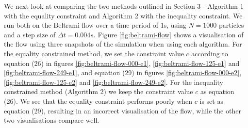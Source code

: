 \documentclass[11pt, oneside]{article}   	%
\newcommand{\dt}{\Delta t}
\begin{document}
We next look at comparing the two methods outlined in Section 3 - Algorithm 1 with the equality constraint and Algorithm 2 with the inequality constraint. We run both on the Beltrami flow over a time period of 1s, using \(N = 1000\) particles and a step size of \(\dt = 0.004s\). Figure \ref{fig:beltrami-flow} shows a visualisation of the flow using three snapshots of the simulation when using each algorithm.  For the equality constrained method, we set the constraint value \(c\) according to equation (26) in figures \ref{fig:beltrami-flow-000-e1}, \ref{fig:beltrami-flow-125-e1} and \ref{fig:beltrami-flow-249-e1}, and equation (29) in figures \ref{fig:beltrami-flow-000-e2}, \ref{fig:beltrami-flow-125-e2} and \ref{fig:beltrami-flow-249-e2}. For the inequality constrained method (Algorithm 2) we keep the constraint value \(c\) as equation (26). We see that the equality constraint performs poorly when \(c\) is set as equation (29), resulting in an incorrect visualisation of the flow, while the other two visualisations compare well.
\end{document}
